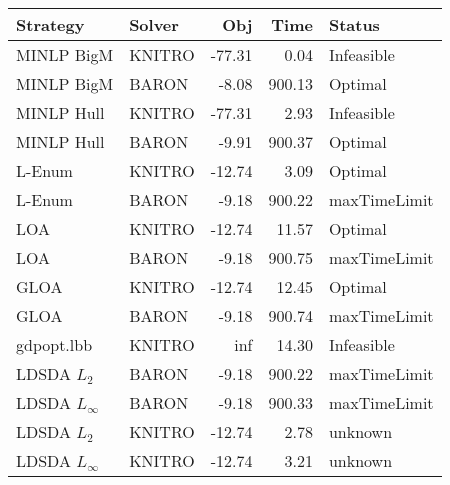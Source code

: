 \begin{tabular}{llrrl}
\toprule
Strategy & Solver & Obj & Time & Status \\
\midrule
MINLP BigM & KNITRO & -77.31 & 0.04 & Infeasible \\
MINLP BigM & BARON & -8.08 & 900.13 & Optimal \\
MINLP Hull & KNITRO & -77.31 & 2.93 & Infeasible \\
MINLP Hull & BARON & -9.91 & 900.37 & Optimal \\
L-Enum & KNITRO & -12.74 & 3.09 & Optimal \\
L-Enum & BARON & -9.18 & 900.22 & maxTimeLimit \\
LOA & KNITRO & -12.74 & 11.57 & Optimal \\
LOA & BARON & -9.18 & 900.75 & maxTimeLimit \\
GLOA & KNITRO & -12.74 & 12.45 & Optimal \\
GLOA & BARON & -9.18 & 900.74 & maxTimeLimit \\
gdpopt.lbb & KNITRO & inf & 14.30 & Infeasible \\
LDSDA $L_2$ & BARON & -9.18 & 900.22 & maxTimeLimit \\
LDSDA $L_\infty$ & BARON & -9.18 & 900.33 & maxTimeLimit \\
LDSDA $L_2$ & KNITRO & -12.74 & 2.78 & unknown \\
LDSDA $L_\infty$ & KNITRO & -12.74 & 3.21 & unknown \\
\bottomrule
\end{tabular}

